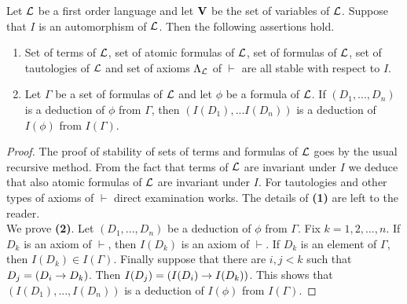 \documentclass[10pt]{amsart}
\begin{document}
\begin{theorem}\label{theorem:stability_under_automorphisms}
	Let ${\mathcal L}$ be a first order language and let $\mathbf{V}$ be the set of variables of ${\mathcal L}$. Suppose that $I$ is an automorphism of ${\mathcal L}$. Then the following assertions hold.
	\begin{enumerate}[label=\textbf{\emph{(\arabic*)}}, leftmargin=3.0em]
		\item Set of terms of ${\mathcal L}$, set of atomic formulas of ${\mathcal L}$, set of formulas of ${\mathcal L}$, set of tautologies of ${\mathcal L}$ and set of
		      axioms $\Lambda_{{\mathcal L}}$ of $\vdash$ are all stable with respect to $I$.
		\item Let $\Gamma$ be a set of formulas of ${\mathcal L}$ and let $\phi$ be a formula of ${\mathcal L}$. If $(D_1 , ..., D_n)$ is a deduction of $\phi$ from $\Gamma$, then $(I(D_1 ), ...I(D_n))$ is a deduction of $I(\phi)$ from $I(\Gamma)$.
	\end{enumerate}
\end{theorem}
\begin{proof}
	The proof of stability of sets of terms and formulas of ${\mathcal L}$ goes by the usual recursive method. From the fact that terms of ${\mathcal L}$ are invariant under $I$ we deduce that also atomic formulas of ${\mathcal L}$ are invariant under $I$. For tautologies and other types of axioms of $\vdash$ direct examination works. The details of \textbf{(1)} are left to the reader.\\
	We prove \textbf{(2)}. Let $(D_1 , ..., D_n)$ be a deduction of $\phi$ from $\Gamma$. Fix $k=1, 2, ..., n$. If $D_k$ is an axiom of $\vdash$, then $I(D_k)$ is an axiom of $\vdash$. If $D_k$ is an element of $\Gamma$, then $I(D_k) \in I(\Gamma)$. Finally suppose that there are $i, j < k$ such that $D_j = (D_i \rightarrow D_k)$. Then $I(D_j) = \left(I(D_i) \rightarrow I(D_k)\right)$. This shows that $(I(D_1), ..., I(D_n))$ is a deduction of $I(\phi)$ from $I(\Gamma)$.
\end{proof}
\end{document}
